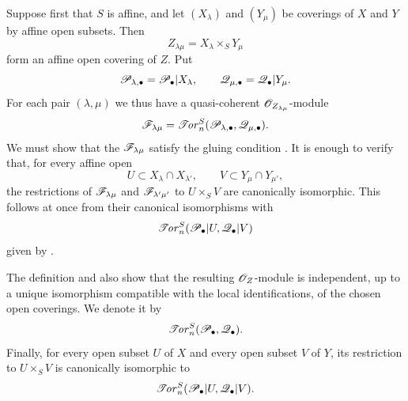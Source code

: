 \begin{env}[6.5.2]
\label{III.6.5.2}
Suppose first that $S$ is affine, and let $(X_\lambda)$ and
$(Y_\mu)$ be coverings of $X$ and $Y$ by affine open subsets.
Then
\[
  Z_{\lambda\mu}=X_\lambda\times_SY_\mu
\]
form an affine open covering of $Z$.  Put
\[
  \mathscr{P}_{\lambda,\bullet}=\mathscr{P}_\bullet|X_\lambda,
  \qquad
  \mathscr{Q}_{\mu,\bullet}=\mathscr{Q}_\bullet|Y_\mu.
\]
For each pair $(\lambda,\mu)$ we thus have a quasi-coherent
$\mathscr{O}_{Z_{\lambda\mu}}$-module
\[
  \mathscr{F}_{\lambda\mu}
  =
  \mathscr{T}\!\mathit{or}_n^S(\mathscr{P}_{\lambda,\bullet},\mathscr{Q}_{\mu,\bullet}).
\]
We must show that the $\mathscr{F}_{\lambda\mu}$ satisfy the gluing
condition .  It is enough to verify that, for
every affine open
\[
  U\subset X_\lambda\cap X_{\lambda'},
  \qquad
  V\subset Y_\mu\cap Y_{\mu'},
\]
the restrictions of $\mathscr{F}_{\lambda\mu}$ and
$\mathscr{F}_{\lambda'\mu'}$ to $U\times_SV$ are canonically
isomorphic.  This follows at once from their canonical
isomorphisms with
\[
  \mathscr{T}\!\mathit{or}_n^S(\mathscr{P}_\bullet|U,\mathscr{Q}_\bullet|V)
\]
given by .

The definition and  also show that the resulting
$\mathscr{O}_Z$-module is independent, up to a unique isomorphism
compatible with the local identifications, of the chosen open
coverings.  We denote it by
\[
  \mathscr{T}\!\mathit{or}_n^S(\mathscr{P}_\bullet,\mathscr{Q}_\bullet).
\]
Finally, for every open subset $U$ of $X$ and every open subset
$V$ of $Y$, its restriction to $U\times_SV$ is canonically
isomorphic to
\[
  \mathscr{T}\!\mathit{or}_n^S(\mathscr{P}_\bullet|U,\mathscr{Q}_\bullet|V).
\]
\end{env}

